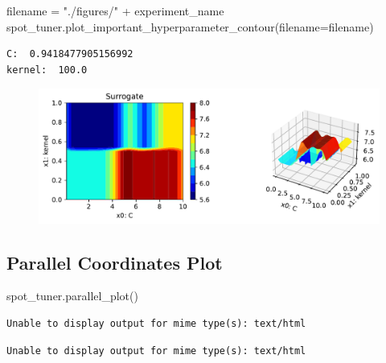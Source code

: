 \documentclass[
  letterpaper,
  DIV=11,
  numbers=noendperiod]{scrreprt}
\newenvironment{Shaded}{\begin{snugshade}}{\end{snugshade}}
\newcommand{\NormalTok}[1]{\textcolor[rgb]{0.00,0.23,0.31}{#1}}
\newcommand{\OperatorTok}[1]{\textcolor[rgb]{0.37,0.37,0.37}{#1}}
\newcommand{\StringTok}[1]{\textcolor[rgb]{0.13,0.47,0.30}{#1}}
\begin{document}
\begin{Shaded}
\begin{Highlighting}[]
\NormalTok{filename }\OperatorTok{=} \StringTok{"./figures/"} \OperatorTok{+}\NormalTok{ experiment\_name}
\NormalTok{spot\_tuner.plot\_important\_hyperparameter\_contour(filename}\OperatorTok{=}\NormalTok{filename)}
\end{Highlighting}
\end{Shaded}

\begin{verbatim}
C:  0.9418477905156992
kernel:  100.0
\end{verbatim}

\begin{figure}[H]

{\centering \includegraphics{017_spot_hpt_sklearn_classification_files/figure-pdf/cell-34-output-2.pdf}

}

\end{figure}

\hypertarget{parallel-coordinates-plot}{%
\subsection{Parallel Coordinates Plot}\label{parallel-coordinates-plot}}

\begin{Shaded}
\begin{Highlighting}[]
\NormalTok{spot\_tuner.parallel\_plot()}
\end{Highlighting}
\end{Shaded}

\begin{verbatim}
Unable to display output for mime type(s): text/html
\end{verbatim}

\begin{verbatim}
Unable to display output for mime type(s): text/html
\end{verbatim}
\end{document}

